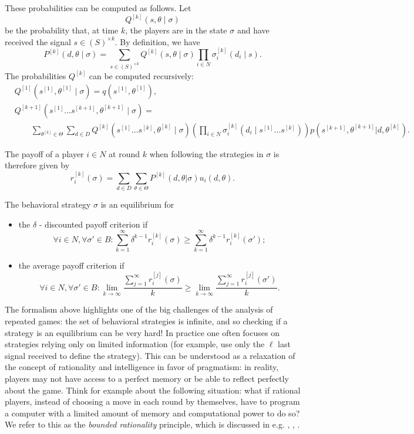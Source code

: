 These probabilities can be computed as follows. Let
$$Q^{[k]}(s,\theta \mid \sigma) $$
be the probability that, at time $k$, the players are in the state $\sigma$ and have received the signal $s \in (S)^{\times k}$.
By definition, we have
$$ P^{[k]}(d, \theta \mid \sigma) = \sum_{s \in (S)^{\times k}} Q^{[k]}(s, \theta \mid \sigma) \prod_{i \in N} \sigma^{[k]}_i(d_i \mid s). $$
The probabilities $Q^{[k]}$ can be computed recursively:
\begin{equation*}
\begin{aligned}
& Q^{[1]}(s^{[1]}, \theta^{[1]} \mid \sigma)  = q(s^{[1]}, \theta^{[1]}), \\
& Q^{[k+1]}(s^{[1]} \ldots s^{[k+1]}, \theta^{[k+1]} \mid \sigma) =  \\
& \qquad \sum_{\theta^{[k]} \in \Theta} \sum_{d \in D} Q^{[k]}(s^{[1]} \ldots s^{[k]}, \theta^{[k]} \mid \sigma) \left( \prod_{i \in N} \sigma_i^{[k]}(d_i \mid s^{[1]} \ldots s^{[k]}) \right ) p(s^{[k+1]}, \theta^{[k+1]}|d,\theta^{[k]}).
\end{aligned}
\end{equation*}

The payoff of a player $i  \in N$ at round $k$ when following the strategies in $\sigma$ is therefore given by
$$ r_i^{[k]}(\sigma)  = \sum_{d \in D} \sum_{\theta \in \Theta} P^{[k]}(d, \theta|\sigma) u_i(d,\theta).$$

\begin{definition}[Equilibrium]
The behavioral strategy $\sigma$ is an equilibrium for
\begin{itemize}
\item the $\delta$ - discounted payoff criterion if
	$$\forall i \in N, \forall \sigma' \in B: \sum_{k = 1}^\infty \delta^{k-1} r_i^{[k]}(\sigma) \geq \sum_{k = 1}^\infty \delta^{k-1} r_i^{[k]}(\sigma');$$
\item the average payoff criterion if
	$$\forall i \in N, \forall \sigma' \in B: \lim_{k \rightarrow \infty}\frac{\sum_{j = 1}^\infty  r_i^{[j]}(\sigma)}{k} \geq \lim_{k \rightarrow \infty}\frac{\sum_{j = 1}^\infty  r_i^{[j]}(\sigma')}{k}.$$
\end{itemize}
\end{definition}

The formalism above highlights one of the big challenges of the analysis of repeated games: the set of behavioral strategies is infinite, and so checking if a strategy is an equilibrium can be very hard!
In practice one often focuses on strategies relying only on limited information (for example, use only the $\ell$ last signal received to define the strategy). This can be understood as a relaxation of the concept of rationality and intelligence in favor of pragmatism: in reality,  players may not have access to a perfect memory or be able to reflect perfectly about the game. Think for example about the following situation: what if rational players, instead of choosing a move in each round by themselves,  have to program a computer with a limited amount of memory and computational power to do so?
We refer to this as the \emph{bounded rationality} principle, which is discussed in e.g.  \cite{RuMBR}, \cite[Section 6.1.3]{ShLeMSAG}, \cite[Chapter 9]{OsRuACIG}.


